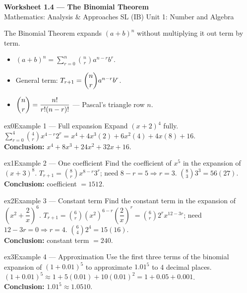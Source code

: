 \documentclass[11pt]{article}
\begin{document}
\begin{center}
{\LARGE\bfseries\color{titleblue}Worksheet 1.4 --- The Binomial Theorem}\\[2pt]
{\small Mathematics: Analysis \& Approaches SL (IB) \textperiodcentered{} Unit 1: Number and Algebra}
\end{center}

\begin{ideabox}
The Binomial Theorem expands $(a+b)^n$ without multiplying it out term by term.
\begin{itemize}[leftmargin=*,itemsep=2pt]
  \item $(a+b)^n=\displaystyle\sum_{r=0}^{n}\binom nr a^{n-r}b^r$.
  \item General term: $T_{r+1}=\dbinom nr a^{n-r}b^r$.
  \item $\dbinom nr=\dfrac{n!}{r!(n-r)!}$ --- Pascal's triangle row $n$.
\end{itemize}
\end{ideabox}


\begin{example}{ex0}{Example 1 --- Full expansion}
Expand $(x+2)^4$ fully.\soln
$\displaystyle\sum_{r=0}^{4}\binom4r x^{4-r}2^r=x^4+4x^3(2)+6x^2(4)+4x(8)+16$.\\[3pt]\textbf{Conclusion:} $x^4+8x^3+24x^2+32x+16$.
\end{example}

\begin{example}{ex1}{Example 2 --- One coefficient}
Find the coefficient of $x^5$ in the expansion of $(x+3)^8$.\soln
$T_{r+1}=\binom8r x^{8-r}3^r$; need $8-r=5\Rightarrow r=3$. $\binom83 3^3=56(27)$.\\[3pt]\textbf{Conclusion:} coefficient $=1512$.
\end{example}

\begin{example}{ex2}{Example 3 --- Constant term}
Find the constant term in the expansion of $\left(x^2+\dfrac{2}{x}\right)^6$.\soln
$T_{r+1}=\binom6r (x^2)^{6-r}\left(\dfrac2x\right)^r=\binom6r 2^r x^{12-3r}$; need $12-3r=0\Rightarrow r=4$. $\binom64 2^4=15(16)$.\\[3pt]\textbf{Conclusion:} constant term $=240$.
\end{example}

\begin{example}{ex3}{Example 4 --- Approximation}
Use the first three terms of the binomial expansion of $(1+0.01)^5$ to approximate $1.01^5$ to 4 decimal places.\soln
$(1+0.01)^5\approx1+5(0.01)+10(0.01)^2=1+0.05+0.001$.\\[3pt]\textbf{Conclusion:} $1.01^5\approx1.0510$.
\end{example}
\end{document}
